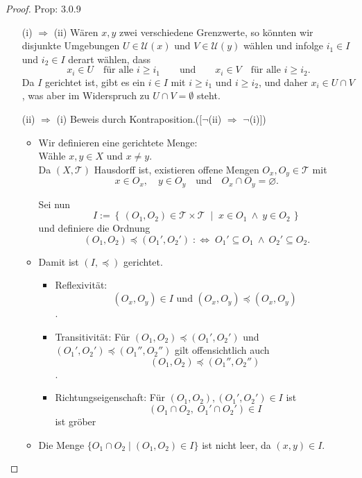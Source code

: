 \begin{proof}{Prop: 3.0.9}\\
    \begin{itemize}
\item[(i) $\Rightarrow$ (ii)] 
    Wären $x, y$ zwei verschiedene Grenzwerte, so könnten wir disjunkte Umgebungen 
    $U \in \mathcal{U}(x)$ und $V \in \mathcal{U}(y)$ wählen und infolge 
    $i_1 \in I$ und $i_2 \in I$ derart wählen, dass 
    $$
    x_i \in U \quad \text{für alle } i \geq i_1
    \qquad \text{und} \qquad
    x_i \in V \quad \text{für alle } i \geq i_2.
    $$
    Da $I$ gerichtet ist, gibt es ein $i \in I$ mit $i \geq i_1$ und $i \geq i_2$, 
    und daher $x_i \in U \cap V$, was aber im Widerspruch zu 
    $U \cap V = \emptyset$ steht.

\item[(ii) $\Rightarrow$ (i)] Beweis durch Kontraposition.([$\neg$(ii) $\Rightarrow$ $\neg$(i)])\\
    \begin{itemize}
    \item    Wir definieren eine gerichtete Menge:\\
    Wähle $x, y \in X$ und $x \neq y$. \\
    Da $(X,\mathcal{T})$ Hausdorff ist, existieren offene Mengen 
    $O_x, O_y \in \mathcal{T}$ mit
    $$
    x \in O_x, \quad y \in O_y \quad \text{und} \quad O_x \cap O_y = \varnothing.
    $$

    Sei nun
    $$
    I := \left\{\, (O_1, O_2) \in \mathcal{T} \times \mathcal{T} \;\middle|\; 
    x \in O_1 \ \land \ y \in O_2 \,\right\}
    $$
    und definiere die Ordnung
    $$
    (O_1, O_2) \preceq (O_1', O_2') 
    \; :\Longleftrightarrow \;
    O_1' \subseteq O_1 \ \land \ O_2' \subseteq O_2.
    $$
    \item Damit ist $(I, \preceq)$ gerichtet.\\
    
    \begin{itemize}
        \item Reflexivität: 
        $$
        (O_x, O_y) \in I\text{ und }(O_x, O_y) \preceq (O_x, O_y)
        $$.
        \item Transitivität: Für $(O_1, O_2) \preceq (O_1', O_2')$ und 
        $(O_1', O_2') \preceq (O_1'', O_2'')$
        gilt offensichtlich auch 
        $$
        (O_1, O_2) \preceq (O_1'', O_2'')
        $$.
        \item Richtungseigenschaft: 
         Für $(O_1, O_2), (O_1', O_2') \in I$ ist
        $$
        (O_1 \cap O_2, \; O_1' \cap O_2') \in I
        $$
        ist gröber
    \end{itemize}
    \item Die Menge $\{O_1 \cap O_2 \mid (O_1, O_2) \in I \}$
    ist nicht leer, da $(x, y) \in I$.


\end{itemize}
\end{itemize}
\end{proof}
